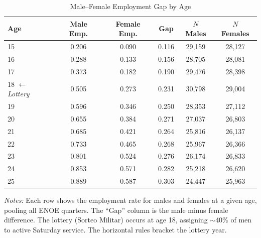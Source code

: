 \begin{table}[t]
\centering
\caption{Male--Female Employment Gap by Age}
\label{tab:age_profile}
\small
\begin{tabular}{lccccc}
\toprule
Age & Male Emp. & Female Emp. & Gap & $N$ Males & $N$ Females \\
\midrule
15 & 0.206 & 0.090 & 0.116 & 29,159 & 28,127 \\
16 & 0.288 & 0.133 & 0.156 & 28,705 & 28,081 \\
17 & 0.373 & 0.182 & 0.190 & 29,476 & 28,398 \\
\midrule
18 $\leftarrow$ \textit{Lottery} & 0.505 & 0.273 & 0.231 & 30,798 & 29,004 \\
\midrule
19 & 0.596 & 0.346 & 0.250 & 28,353 & 27,112 \\
20 & 0.655 & 0.384 & 0.271 & 27,037 & 26,803 \\
21 & 0.685 & 0.421 & 0.264 & 25,816 & 26,137 \\
22 & 0.733 & 0.465 & 0.268 & 25,967 & 26,366 \\
23 & 0.801 & 0.524 & 0.276 & 26,174 & 26,833 \\
24 & 0.853 & 0.571 & 0.282 & 25,218 & 26,620 \\
25 & 0.889 & 0.587 & 0.303 & 24,447 & 25,963 \\
\bottomrule
\end{tabular}
\begin{tablenotes}
\footnotesize
\item \textit{Notes:} Each row shows the employment rate for males and females at a given age, pooling all ENOE quarters. The ``Gap'' column is the male minus female difference. The lottery (Sorteo Militar) occurs at age 18, assigning $\sim$40\% of men to active Saturday service. The horizontal rules bracket the lottery year.
\end{tablenotes}
\end{table}
